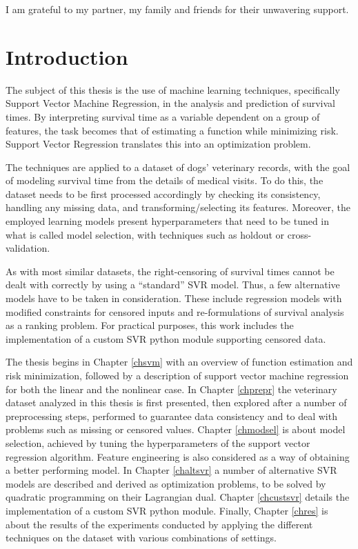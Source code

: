 \documentclass[12pt]{report}
\begin{document}
I am grateful to my partner, my family and friends for their unwavering support.

\afterpreface


\chapter*{Introduction}
\label{intro}
The subject of this thesis is the use of machine learning techniques, specifically Support Vector Machine Regression, in the analysis and prediction of survival times. By interpreting survival time as a variable dependent on a group of features, the task becomes that of estimating a function while minimizing risk. Support Vector Regression translates this into an optimization problem.

The techniques are applied to a dataset of dogs' veterinary records, with the goal of modeling survival time from the details of medical visits. To do this, the dataset needs to be first processed accordingly by checking its consistency, handling any missing data, and transforming/selecting its features. Moreover, the employed learning models present hyperparameters that need to be tuned in what is called model selection, with techniques such as holdout or cross-validation.

As with most similar datasets, the right-censoring of survival times cannot be dealt with correctly by using a ``standard'' SVR model. Thus, a few alternative models have to be taken in consideration. These include regression models with modified constraints for censored inputs and re-formulations of survival analysis as a ranking problem. For practical purposes, this work includes the implementation of a custom SVR python module supporting censored data.

The thesis begins in Chapter \ref{chsvm} with an overview of function estimation and risk minimization, followed by a description of support vector machine regression for both the linear and the nonlinear case. In Chapter \ref{chprepr} the veterinary dataset analyzed in this thesis is first presented, then explored after a number of preprocessing steps, performed to guarantee data consistency and to deal with problems such as missing or censored values. Chapter \ref{chmodsel} is about model selection, achieved by tuning the hyperparameters of the support vector regression algorithm. Feature engineering is also considered as a way of obtaining a better performing model. In Chapter \ref{chaltsvr} a number of alternative SVR models are described and derived as optimization problems, to be solved by quadratic programming on their Lagrangian dual. Chapter \ref{chcustsvr} details the implementation of a custom SVR python module. Finally, Chapter \ref{chres} is about the results of the experiments conducted by applying the different techniques on the dataset with various combinations of settings.
\newpage
\end{document}
